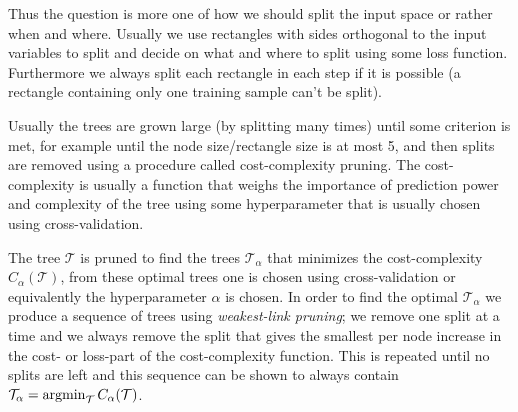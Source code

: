 \documentclass[a4paper, 12pt]{scrartcl}
\begin{document}
Thus the question is more one of how we should split the input space or rather when and where.
Usually we use rectangles with sides orthogonal to the input variables to split and decide on what and where to split using some loss function.
Furthermore we always split each rectangle in each step if it is possible (a rectangle containing only one training sample can't be split).

Usually the trees are grown large (by splitting many times) until some criterion is met, for example until the node size/rectangle size is at most 5, and then splits are removed using a procedure called cost-complexity pruning.
The cost-complexity is usually a function that weighs the importance of prediction power and complexity of the tree using some hyperparameter that is usually chosen using cross-validation.

The tree $\mathcal{T}$ is pruned to find the trees $\mathcal{T}_\alpha$ that minimizes the cost-complexity $C_\alpha\left(\mathcal{T}\right)$, from these optimal trees one is chosen using cross-validation or equivalently the hyperparameter $\alpha$ is chosen.
In order to find the optimal $\mathcal{T}_\alpha$ we produce a sequence of trees using \emph{weakest-link pruning}; we remove one split at a time and we always remove the split that gives the smallest per node increase in the cost- or loss-part of the cost-complexity function.
This is repeated until no splits are left and this sequence can be shown to always contain $\mathcal{T}_\alpha = \operatornamewithlimits{argmin}_\mathcal{T}C_\alpha(\mathcal{T})$.
\end{document}
